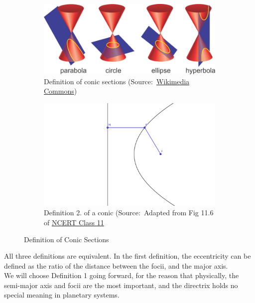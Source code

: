 \documentclass[12pt]{article}
\begin{document}
	\begin{figure}[!h]
		\centering
		\begin{subfigure}[b]{0.45\textwidth}
			\centering
			\includegraphics[width=\textwidth]{all_conics.png}
			\caption{Definition of conic sections (Source:~\href{https://upload.wikimedia.org/wikipedia/commons/thumb/9/96/Ellipse-def0.svg/300px-Ellipse-def0.svg.png}{Wikimedia Commons})}
			\label{all_conics}
		\end{subfigure}
		\hfill
		\begin{subfigure}[b]{0.45\textwidth}
			\centering
			\includegraphics[width=\textwidth]{conic.png}
			\caption{Definition 2. of a conic (Source:~Adapted from Fig 11.6 of \href{http://ncert.nic.in/ncerts/l/keep211.pdf}{NCERT Class 11}}
			\label{def_conic}
		\end{subfigure}
		\hfill
		\caption{Definition of Conic Sections}
	\end{figure}
	All three definitions are equivalent. In the first definition, the eccentricity can be defined as the ratio of the distance between the focii, and the major axis. \\We will choose Definition 1 going forward, for the reason that physically, the semi-major axis and focii are the most important, and the directrix holds no special meaning in planetary systems.
	\newpage
	\lfoot{}
\end{document}

